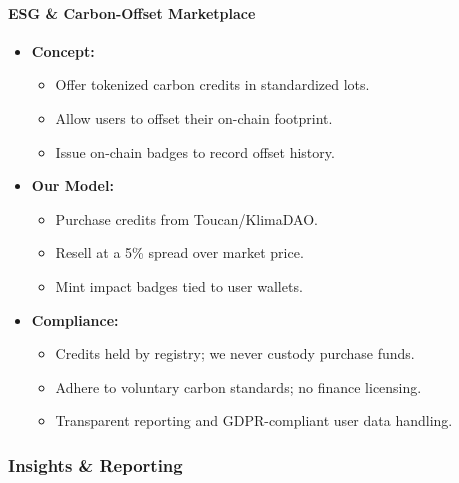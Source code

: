 \documentclass[13pt]{extarticle}
\begin{document}
\paragraph{ESG \& Carbon-Offset Marketplace}
\begin{itemize}[left=1em]
  \item \textbf{Concept:}
    \begin{itemize}[left=1.2em]
      \item Offer tokenized carbon credits in standardized lots.
      \item Allow users to offset their on-chain footprint.
      \item Issue on-chain badges to record offset history.
    \end{itemize}
  \item \textbf{Our Model:}
    \begin{itemize}[left=1.2em]
      \item Purchase credits from Toucan/KlimaDAO.
      \item Resell at a 5\% spread over market price.
      \item Mint impact badges tied to user wallets.
    \end{itemize}
  \item \textbf{Compliance:}
    \begin{itemize}[left=1.2em]
      \item Credits held by registry; we never custody purchase funds.
      \item Adhere to voluntary carbon standards; no finance licensing.
      \item Transparent reporting and GDPR-compliant user data handling.
    \end{itemize}
\end{itemize}

\subsubsection{Insights \& Reporting}
\end{document}
